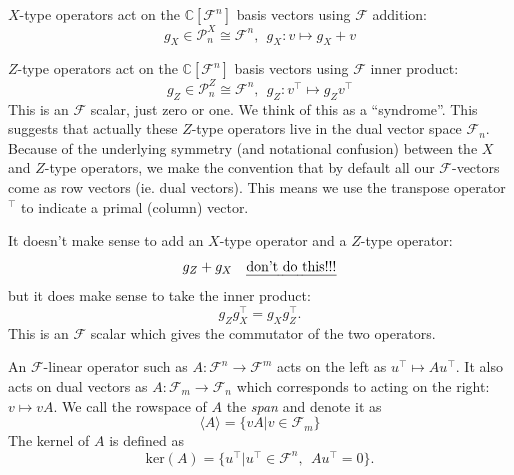 \documentclass[a4paper,onecolumn,11pt,unpublished]{quantumarticle}
\def\Complex{\mathbb{C}}
\def\Pauli{\mathcal{P}}
\def\Span#1{\langle #1 \rangle}
\newcommand{\Field}{\mathcal{F}}
\def\Ker{\mathrm{ker}}
\def\Fn{\Field^n}
\def\Fm{\Field^m}
\def\Fnd{\Field_{n}}
\def\Fmd{\Field_{m}}
\begin{document}
$X$-type operators act on the $\Complex[\Fn]$
basis vectors using $\Field$ addition:
$$
    g_X \in \Pauli^X_n \cong \Fn, \ \ g_X : v \longmapsto g_X + v
$$

$Z$-type operators act on the
$\Complex[\Fn]$ basis vectors using $\Field$ inner product:
$$
    g_Z \in \Pauli^Z_n \cong \Fn, \ \ g_Z : v^\top \longmapsto g_Z v^\top
$$
This is an $\Field$ scalar, just zero or one. We think of this
as a ``syndrome''.
This suggests that actually these $Z$-type operators
live in the dual vector space $\Fnd.$
Because of the underlying symmetry
(and notational confusion)
between the $X$ and $Z$-type operators,
we make the convention that by default
all our $\Field$-vectors come as row vectors (ie. dual vectors).
This means we use the transpose operator $^\top$ to
indicate a primal (column) vector.

It doesn't make sense to add an $X$-type operator and
a $Z$-type operator:
$$
    g_Z + g_X \ \ \ \mbox{\emph{don't do this!!!}}
$$
but it does make sense to take the inner product:
$$
    g_Z g_X^\top = g_X g_Z^\top.
$$
This is an $\Field$ scalar which gives the commutator of the 
two operators.

An $\Field$-linear operator such as
$ A : \Fn \to \Fm $
acts on the left as $ u^\top \mapsto A u^\top.$
It also acts on dual vectors as
$ A : \Fmd \to \Fnd $
which corresponds to acting on the right: $v \mapsto vA.$ 
We call the rowspace of 
$A$ the \emph{span} and denote 
it as 
$$\Span{A} = \{ vA | v \in \Fmd \}$$
The kernel of $A$ is defined as
$$
    \Ker(A) = \{ u^\top | u^\top \in \Fn,\ \  A u^\top = 0 \}.
$$
\end{document}
